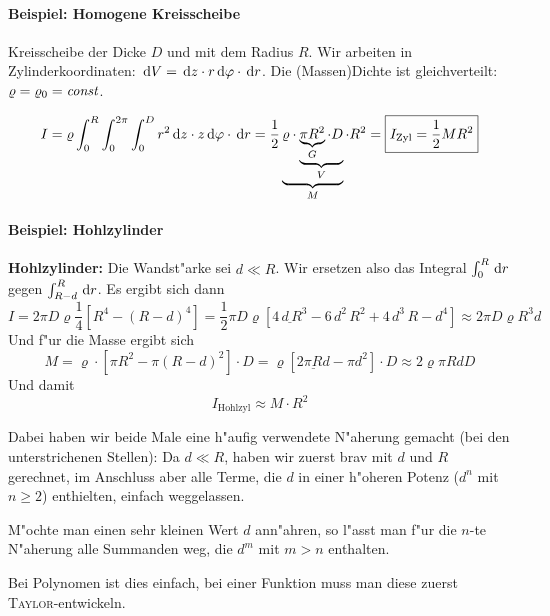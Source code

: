 \paragraph{Beispiel: Homogene Kreisscheibe}
\label{kap_beispiel:-homogene-kreisscheibe}

Kreisscheibe der Dicke $D$ und mit dem Radius $R$. Wir arbeiten in
Zylinderkoordinaten: $\, \mathrm{d} V = \, \mathrm{d} z \cdot r \, \mathrm{d}
\varphi \cdot \, \mathrm{d} r$. Die (Massen)Dichte ist gleichverteilt: $\varrho =
\varrho_0 = \text{\emph{const}}$. 

$$
I = \varrho \int_0^R  \int_0^{2\pi} \int_0^D r^2 \, \mathrm{d} z \cdot z \, \mathrm{d}
\varphi \cdot \, \mathrm{d} r = \frac{1}{2}  \underbrace{ \varrho \cdot
\underbrace{\underbrace{\pi
    R^2}_G \cdot D}_V}_M \cdot R^2 = \boxed{I_\text{Zyl} = \frac{1}{2}
M R^2 }
$$



 \paragraph{Beispiel: Hohlzylinder}
 \label{kap_beispiel:-hohlzylinder}


 \textbf{Hohlzylinder:}
Die Wandst"arke sei $d \ll R$. Wir ersetzen also das Integral
$\int_0^R\, \mathrm{d} r$ gegen $\int_{R - d}^R\, \mathrm{d} r$. Es ergibt
sich dann
$$
I =  2 \pi D \varrho \frac{1}{4} \left [ R^4 - (R-d)^4 \right ] = 
\frac{1}{2} \pi D \varrho [
\underline{4\, d\,{R}^{3}}-6\,{d}^{2}\,{R}^{2}+4\,{d}^{3}\,R-{d}^{4} ] \approx 2\pi
D \varrho R^3d
$$
Und f"ur die Masse ergibt sich
$$
M = \varrho \cdot [ \pi R^2 - \pi (R-d)^2 ] \cdot D = \varrho [
\underline{ 2\pi R d} - \pi d^2 ] \cdot D \approx 2 \varrho \pi R d D
$$
Und damit 
\begin{equation}
   \label{eq:48}
   \boxed{
I_\text{Hohlzyl} \approx M \cdot R^2
}
\end{equation}


Dabei haben wir beide Male eine h"aufig verwendete {N"aherung} gemacht
(bei den unterstrichenen Stellen): Da $d \ll R$, haben wir zuerst brav
mit $d$ und $R$ gerechnet, im Anschluss aber alle Terme, die $d$ in
einer h"oheren Potenz ($d^n$ mit $n \geq 2$) enthielten, einfach
weggelassen.

\begin{Wichtig}
M"ochte man einen sehr kleinen Wert $d$ ann"ahren, so l"asst man f"ur die
$n$-te N"aherung alle Summanden weg, die $d^m$ mit $m > n$ enthalten.

Bei Polynomen ist dies einfach, bei einer Funktion muss man diese
zuerst \textsc{Taylor}-entwickeln.
\end{Wichtig}

